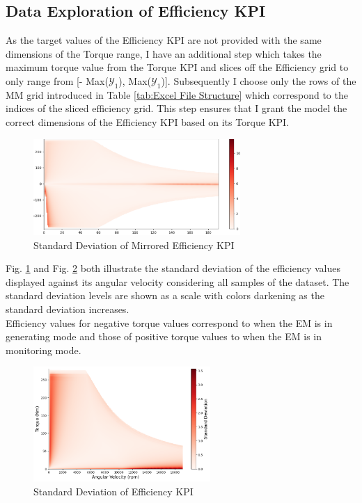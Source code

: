 \documentclass{report} %
\begin{document}
\subsection{Data Exploration of Efficiency KPI}\label{subsec:Deep Dive into 3D KPI}
As the target values of the Efficiency \ac{KPI} are not provided with the same dimensions of the Torque range, I have an additional step which takes the maximum 
torque value from the Torque \ac{KPI} and slices off the Efficiency grid to only range from [- Max($\mathcal{Y}_1$), Max($\mathcal{Y}_1$)]. 
Subsequently I choose only the rows of the MM grid introduced in Table \ref{tab:Excel File Structure} which correspond to the indices of the sliced efficiency grid.
This step ensures that I grant the model the correct dimensions of the Efficiency \ac{KPI} based on its Torque \ac{KPI}.

\begin{figure}[H]
    \centering
    \includegraphics[width=0.7\textwidth]{./ReportImages/stddev_y2_full.png} 
    \caption{Standard Deviation of Mirrored Efficiency \ac{KPI}} 
    \label{fig:Standard Deviation of Efficiency KPI(Mirrored Map)}
\end{figure}

Fig. \ref{fig:Standard Deviation of Efficiency KPI(Mirrored Map)} and Fig. \ref{fig:Standard Deviation of Efficiency KPI} both illustrate the standard deviation 
of the efficiency values displayed against its angular velocity considering all samples of the dataset. The standard deviation levels are shown as a scale with colors 
darkening as the standard deviation increases.\\
Efficiency values for negative torque values correspond to when the \ac{EM} is in generating mode and those of positive torque values to when the \ac{EM} is in 
monitoring mode.

\begin{figure}[H]
    \centering
    \includegraphics[width=0.6\textwidth]{./ReportImages/pos_stddev_y2.png} 
    \caption{Standard Deviation of Efficiency \ac{KPI}} 
    \label{fig:Standard Deviation of Efficiency KPI}
\end{figure}
\end{document}

